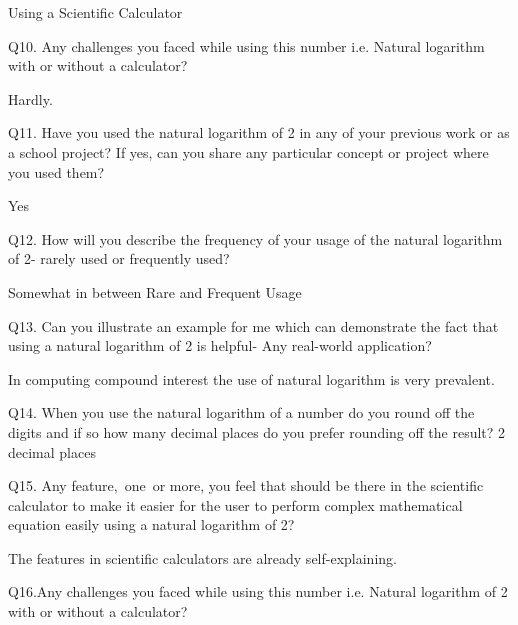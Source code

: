 \documentclass[12pt]{article}
\begin{document}
Using a Scientific Calculator \par

Q10. Any challenges you faced while using this number i.e. Natural logarithm with or without a calculator?\par

Hardly.\par


\vspace{\baselineskip}
Q11. Have you used the natural logarithm of 2 in any of your previous work or as a school project? If yes, can you share any particular concept or project where you used them?\par

Yes\par


\vspace{\baselineskip}
Q12. How will you describe the frequency of your usage of the natural logarithm of 2- rarely used or frequently used?\par

Somewhat in between Rare and Frequent Usage\par


\vspace{\baselineskip}
Q13. Can you illustrate an example for me which can demonstrate the fact that using a natural logarithm of 2 is helpful- Any real-world application?\par

In computing compound interest the use of natural logarithm is very prevalent.\par


\vspace{\baselineskip}
Q14. When you use the natural logarithm of a number do you round off the digits and if so how many decimal places do you prefer rounding off the result? 2 decimal places\par


\vspace{\baselineskip}
Q15. Any feature,\  one\ or more,  you feel that should be there in the scientific calculator to make it easier for the user to perform complex mathematical equation easily using a natural logarithm of 2?\par

The features in scientific calculators are already self-explaining.\par


\vspace{\baselineskip}
Q16.Any challenges you faced while using this number i.e. Natural logarithm of 2 with or without a calculator?\par
\end{document}

